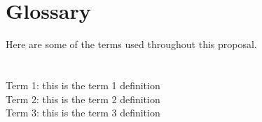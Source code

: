 %
\pagestyle{empty}
\hfill
{}
\section*{Glossary}

Here are some of the terms used throughout this proposal. \\
\\
\\
Term 1: this is the term 1 definition \\
Term 2: this is the term 2 definition \\
Term 3: this is the term 3 definition \\
%
